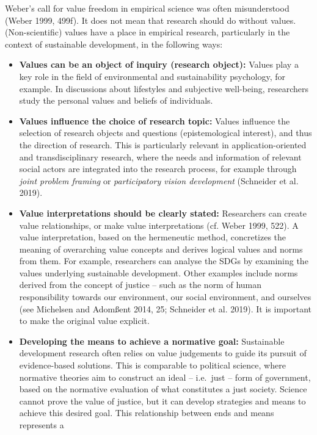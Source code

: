 \documentclass[
  a4paper,
  DIV=11,
  numbers=noendperiod,
  oneside,
  openany]{scrreprt}
\begin{document}
Weber's call for value freedom in empirical science was often
misunderstood (Weber 1999, 499f). It does not mean that research should
do without values. (Non-scientific) values have a place in empirical
research, particularly in the context of sustainable development, in the
following ways:

\begin{itemize}
\item
  \textbf{Values can be an object of inquiry (research object):} Values
  play a key role in the field of environmental and sustainability
  psychology, for example. In discussions about lifestyles and
  subjective well-being, researchers study the personal values and
  beliefs of individuals.
\item
  \textbf{Values influence the choice of research topic:} Values
  influence the selection of research objects and questions
  (epistemological interest), and thus the direction of research. This
  is particularly relevant in application-oriented and transdisciplinary
  research, where the needs and information of relevant social actors
  are integrated into the research process, for example through
  \emph{joint problem framing} or \emph{participatory vision
  development} (Schneider et al. 2019).
\item
  \textbf{Value interpretations should be clearly stated:} Researchers
  can create value relationships, or make value interpretations (cf.
  Weber 1999, 522). A value interpretation, based on the hermeneutic
  method, concretizes the meaning of overarching value concepts and
  derives logical values and norms from them. For example, researchers
  can analyse the SDGs by examining the values underlying sustainable
  development. Other examples include norms derived from the concept of
  justice -- such as the norm of human responsibility towards our
  environment, our social environment, and ourselves (see Michelsen and
  Adomßent 2014, 25; Schneider et al. 2019). It is important to make the
  original value explicit.
\item
  \textbf{Developing the means to achieve a normative goal:} Sustainable
  development research often relies on value judgements to guide its
  pursuit of evidence-based solutions. This is comparable to political
  science, where normative theories aim to construct an ideal --
  i.e.~just -- form of government, based on the normative evaluation of
  what constitutes a just society. Science cannot prove the value of
  justice, but it can develop strategies and means to achieve this
  desired goal. This relationship between ends and means represents a

\end{itemize}
\end{document}
